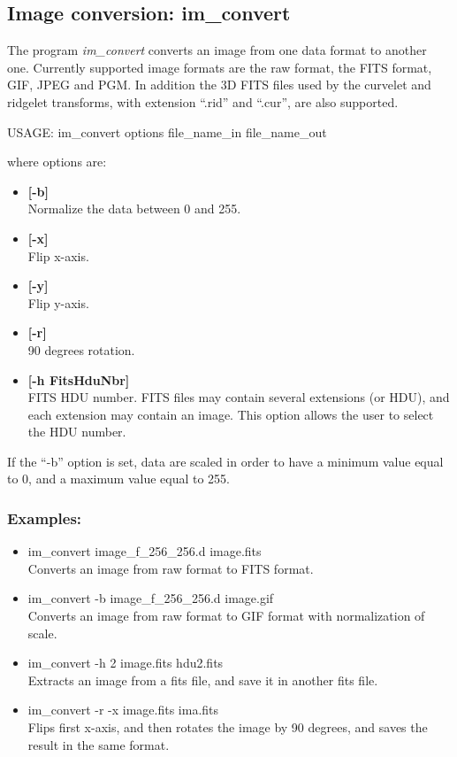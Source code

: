 \subsection{Image conversion: im\_convert}
The program {\em im\_convert} converts 
an image from one data format to another one. 
Currently supported image formats are the raw format, the FITS format, 
GIF, JPEG and PGM.  In addition the 3D FITS files used by the curvelet 
and ridgelet transforms, with extension ``.rid'' and ``.cur'', are also 
supported. 
{\bf
\begin{center}
     USAGE: im\_convert options file\_name\_in file\_name\_out
\end{center}
}
where options are:
\begin{itemize}
\item {\bf[-b]} \\
Normalize the data between 0 and 255.
\item {\bf[-x]} \\
Flip x-axis.
\item {\bf[-y]} \\
Flip y-axis.
\item {\bf[-r]} \\
90 degrees rotation.
\item {\bf[-h FitsHduNbr]} \\
FITS HDU number. FITS files may contain several extensions (or HDU), and
each extension may contain an image. This option allows the user to 
select the HDU number.
\end{itemize}
If the ``-b'' option is set, data are scaled in order to have a minimum value
equal to 0, and a maximum value equal to 255.
\subsubsection*{Examples:}
\begin{itemize}
\item im\_convert image\_f\_256\_256.d image.fits \\
Converts an image from raw format to FITS format.
\item im\_convert -b image\_f\_256\_256.d image.gif \\
Converts an image from raw format to GIF format with  normalization of scale.
\item im\_convert -h 2 image.fits  hdu2.fits \\
Extracts an image from a fits file, and save it in another fits file.
\item im\_convert -r -x image.fits  ima.fits \\
Flips first x-axis, and then rotates the image by 90 degrees, and saves 
the result in the same format.
\end{itemize}


